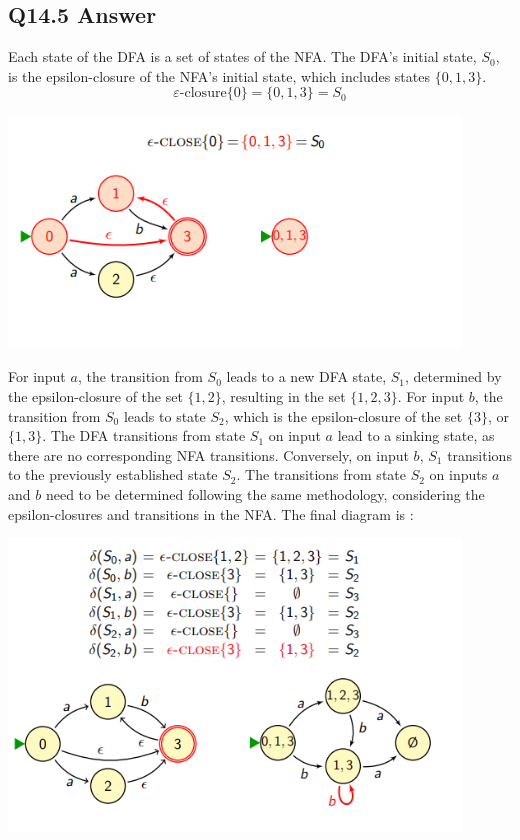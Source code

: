 \documentclass{article}
\begin{document}
\subsection*{Q14.5 Answer}
Each state of the DFA is a set of states of the NFA. The DFA's initial state, $S_0$, is the epsilon-closure of the NFA's initial state, which includes states $\{0, 1, 3\}$.
\[\varepsilon\text{-closure}\{0\} = \{0, 1, 3\} = S_0\]
\begin{center}
    \includegraphics[width=12cm]{4.png}
\end{center}
For input $a$, the transition from $S_0$ leads to a new DFA state, $S_1$, determined by the epsilon-closure of the set $\{1, 2\}$, resulting in the set $\{1, 2, 3\}$. For input $b$, the transition from $S_0$ leads to state $S_2$, which is the epsilon-closure of the set $\{3\}$, or $\{1, 3\}$. The DFA transitions from state $S_1$ on input $a$ lead to a sinking state, as there are no corresponding NFA transitions. Conversely, on input $b$, $S_1$ transitions to the previously established state $S_2$. The transitions from state $S_2$ on inputs $a$ and $b$ need to be determined following the same methodology, considering the epsilon-closures and transitions in the NFA.
The final diagram is : 
\begin{center}
    \includegraphics[width=12cm]{5.png}
\end{center}
\newpage
{}
\end{document}
